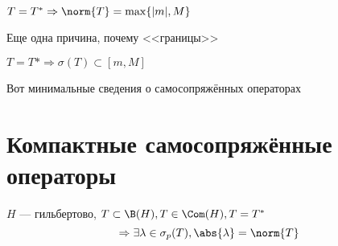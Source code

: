 \documentclass[document]{subfiles}
\begin{document}
\begin{remark}
    $T = T^* \Rightarrow \norm{T} = \max\{ |m|, M \}$
\end{remark}
Еще одна причина, почему <<границы>>
\begin{remark}
    $T = T* \Rightarrow \sigma(T) \subset [m, M]$
\end{remark}

Вот минимальные сведения о самосопряжённых операторах 

\section{Компактные самосопряжённые операторы}

\begin{theorem}
    $H$ --- гильбертово, $T \subset \B(H), T \in \Com(H), T = T^*$
    \[ \Rightarrow \exists \lambda \in \sigma_p(T), \abs{\lambda} = \norm{T} \]
\end{theorem}
\end{document}
